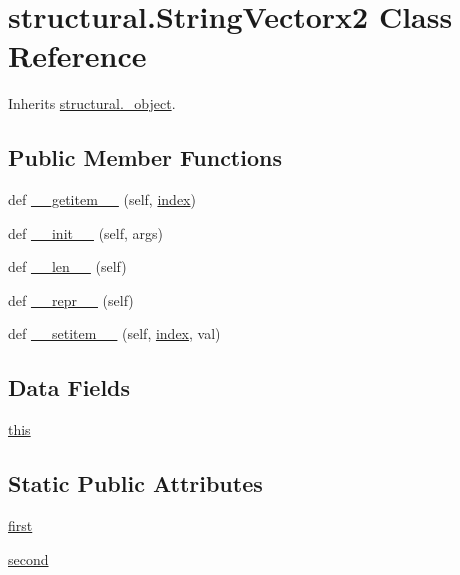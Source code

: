 \hypertarget{classstructural_1_1_string_vectorx2}{}\section{structural.\+String\+Vectorx2 Class Reference}
\label{classstructural_1_1_string_vectorx2}


Inherits \hyperlink{classstructural_1_1__object}{structural.\+\_\+object}.

\subsection*{Public Member Functions}
\begin{DoxyCompactItemize}
\item 
def \hyperlink{classstructural_1_1_string_vectorx2_a27cde4c7bea7e54fe5644531cb7ddc38}{\+\_\+\+\_\+getitem\+\_\+\+\_\+} (self, \hyperlink{lp__lib_8h_a1499949ec4dbbc5290ece2ac210bba35}{index})
\item 
def \hyperlink{classstructural_1_1_string_vectorx2_a719b630817c88b6d1eca21bc7cb62275}{\+\_\+\+\_\+init\+\_\+\+\_\+} (self, args)
\item 
def \hyperlink{classstructural_1_1_string_vectorx2_a1c1420224d937cbc814435822d30e2ab}{\+\_\+\+\_\+len\+\_\+\+\_\+} (self)
\item 
def \hyperlink{classstructural_1_1_string_vectorx2_a5628b1dcef25b338e317311fb9e0d44f}{\+\_\+\+\_\+repr\+\_\+\+\_\+} (self)
\item 
def \hyperlink{classstructural_1_1_string_vectorx2_a6e5d00380df0aadfd26a5903775fe88c}{\+\_\+\+\_\+setitem\+\_\+\+\_\+} (self, \hyperlink{lp__lib_8h_a1499949ec4dbbc5290ece2ac210bba35}{index}, val)
\end{DoxyCompactItemize}
\subsection*{Data Fields}
\begin{DoxyCompactItemize}
\item 
\hyperlink{classstructural_1_1_string_vectorx2_a105e21334b864151774306af8b5f9f2c}{this}
\end{DoxyCompactItemize}
\subsection*{Static Public Attributes}
\begin{DoxyCompactItemize}
\item 
\hyperlink{classstructural_1_1_string_vectorx2_a0e92a822dce6dd1634f9ab4983fcd145}{first}
\item 
\hyperlink{classstructural_1_1_string_vectorx2_acb2b9ae3b02efa7a8140f993f45b2199}{second}
\end{DoxyCompactItemize}


